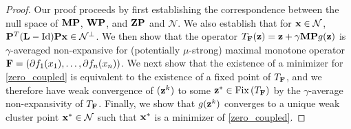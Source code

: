 \begin{proof}
Our proof proceeds by first establishing the correspondence between the null space of $\mathbf{M}\mathbf{P}$, $\mathbf{W}\mathbf{P}$, and $\mathbf{Z}\mathbf{P}$ and $\mathcal{N}$. 
We also establish that for $\mathbf{x} \in \mathcal{N}$, $\mathbf{P}^T(\mathbf{L}-\mathrm{Id})\mathbf{P}\mathbf{x} \in \mathcal{N}^\perp$.
We then show that the operator $T_{\mathbf{F}}(\mathbf{z}) = \mathbf{z} + \gamma \mathbf{M}\mathbf{P}g(\mathbf{z})$ is $\gamma$-averaged non-expansive for (potentially $\mu$-strong) maximal monotone operator $\mathbf{F} = \left(\partial f_1(x_1), \dots, \partial f_n(x_n)\right)$.
We next show that the existence of a minimizer for \eqref{zero_coupled} is equivalent to the existence of a fixed point of $T_{\mathbf{F}}$, and we therefore have weak convergence of $(\mathbf{z}^k)$ to some $\mathbf{z}^* \in \text{Fix}\left(T_{\mathbf{F}}\right)$ by the $\gamma$-average non-expansivity of $T_{\mathbf{F}}$.
Finally, we show that $g(\mathbf{z}^k)$ converges to a unique weak cluster point $\mathbf{x}^* \in \mathcal{N}$ such that $\mathbf{x}^*$ is a minimizer of \eqref{zero_coupled}.


\end{proof}
